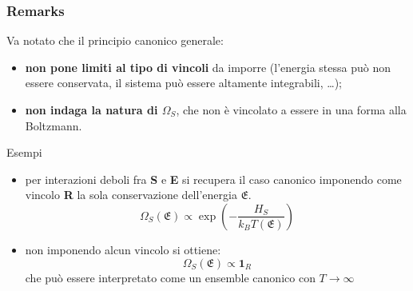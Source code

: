 \documentclass[10pt]{beamer}	%
\theoremstyle{definition}
\theoremstyle{plain}
\begin{document}
\begin{frame}
	\frametitle{Remarks}
	
	Va notato che il principio canonico generale: %
	\begin{itemize}
		\item \textbf{non pone limiti al tipo di vincoli} da imporre (l'energia stessa può non essere conservata, il sistema può essere altamente integrabili, \dots);
		\item \textbf{non indaga la natura di $\Omega_S$}, che non è vincolato a essere in una forma alla Boltzmann.
	\end{itemize}

	\pause
	\begin{exampleblock}{Esempi}
		\begin{itemize}
			\item per interazioni deboli fra \textbf{S} e \textbf{E} si recupera il caso canonico imponendo come vincolo \textbf{R} la sola conservazione dell'energia $\mathfrak{E}$.
			\begin{equation*}
				\Omega_S(\mathfrak{E}) \propto \exp\left( - \frac{H_S}{k_B T(\mathfrak{E})}\right)
			\end{equation*}
			\pause
			\item non imponendo alcun vincolo si ottiene:
			\begin{equation*}
			\Omega_S(\mathfrak{E}) \propto \mathbf{1}_R
			\end{equation*}
			che può essere interpretato come un ensemble canonico con $T \rightarrow \infty$
		\end{itemize}
	\end{exampleblock}
\end{frame}
\end{document}

